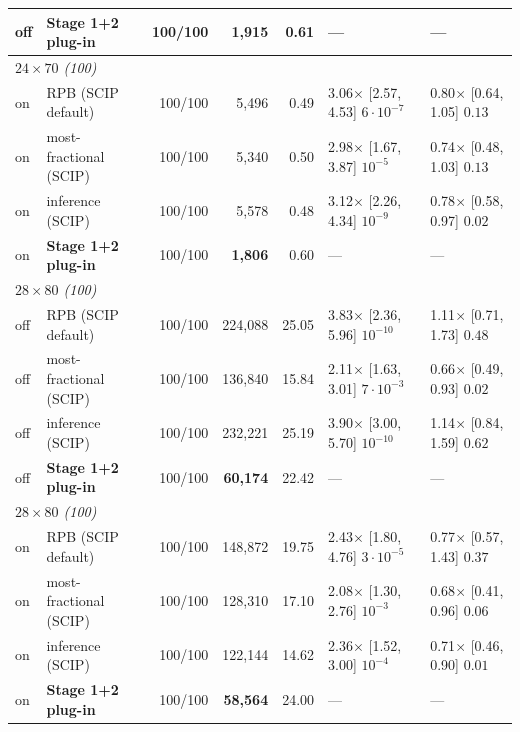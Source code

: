 \begin{table}[t]
\begin{tabular}{llrrrll}
off & \textbf{Stage 1+2 plug-in} & 100/100 & \textbf{1,915} & 0.61 & --- & --- \\
\midrule
\multicolumn{7}{l}{\emph{$24\times70$ (100)}} \\
on & RPB (SCIP default) & 100/100 & 5,496 & 0.49 & 3.06$\times$ [2.57, 4.53] $6\cdot10^{-7}$ & 0.80$\times$ [0.64, 1.05] $0.13$ \\
on & most-fractional (SCIP) & 100/100 & 5,340 & 0.50 & 2.98$\times$ [1.67, 3.87] $10^{-5}$ & 0.74$\times$ [0.48, 1.03] $0.13$ \\
on & inference (SCIP) & 100/100 & 5,578 & 0.48 & 3.12$\times$ [2.26, 4.34] $10^{-9}$ & 0.78$\times$ [0.58, 0.97] $0.02$ \\
on & \textbf{Stage 1+2 plug-in} & 100/100 & \textbf{1,806} & 0.60 & --- & --- \\
\midrule
\multicolumn{7}{l}{\emph{$28\times80$ (100)}} \\
off & RPB (SCIP default) & 100/100 & 224,088 & 25.05 & 3.83$\times$ [2.36, 5.96] $10^{-10}$ & 1.11$\times$ [0.71, 1.73] $0.48$ \\
off & most-fractional (SCIP) & 100/100 & 136,840 & 15.84 & 2.11$\times$ [1.63, 3.01] $7\cdot10^{-3}$ & 0.66$\times$ [0.49, 0.93] $0.02$ \\
off & inference (SCIP) & 100/100 & 232,221 & 25.19 & 3.90$\times$ [3.00, 5.70] $10^{-10}$ & 1.14$\times$ [0.84, 1.59] $0.62$ \\
off & \textbf{Stage 1+2 plug-in} & 100/100 & \textbf{60,174} & 22.42 & --- & --- \\
\midrule
\multicolumn{7}{l}{\emph{$28\times80$ (100)}} \\
on & RPB (SCIP default) & 100/100 & 148,872 & 19.75 & 2.43$\times$ [1.80, 4.76] $3\cdot10^{-5}$ & 0.77$\times$ [0.57, 1.43] $0.37$ \\
on & most-fractional (SCIP) & 100/100 & 128,310 & 17.10 & 2.08$\times$ [1.30, 2.76] $10^{-3}$ & 0.68$\times$ [0.41, 0.96] $0.06$ \\
on & inference (SCIP) & 100/100 & 122,144 & 14.62 & 2.36$\times$ [1.52, 3.00] $10^{-4}$ & 0.71$\times$ [0.46, 0.90] $0.01$ \\
on & \textbf{Stage 1+2 plug-in} & 100/100 & \textbf{58,564} & 24.00 & --- & --- \\
\bottomrule
\end{tabular}
\end{table}